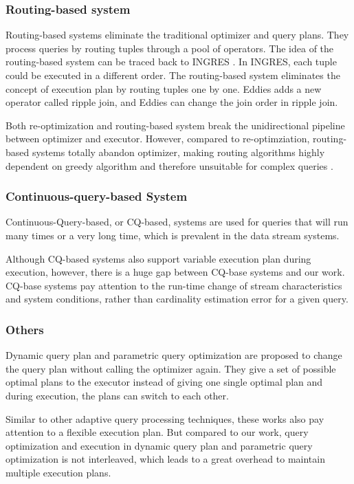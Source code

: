     \subsubsection{Routing-based system} Routing-based systems eliminate the traditional optimizer and query plans. They process queries by routing tuples through a pool of operators. The idea of the routing-based system can be traced back to INGRES \cite{paper46}. In INGRES, each tuple could be executed in a different order. The routing-based system eliminates the concept of execution plan by routing tuples one by one. Eddies \cite{paper30} adds a new operator called ripple join, and Eddies can change the join order in ripple join.\par
    Both re-optimization and routing-based system break the unidirectional pipeline between optimizer and executor. However, compared to re-optimziation, routing-based systems totally abandon optimizer, making routing algorithms highly dependent on greedy algorithm and therefore unsuitable for complex queries \cite{paper47}.
    
    \subsubsection{Continuous-query-based System} Continuous-Query-based, or CQ-based, systems are used for queries that will run many times or a very long time, which is prevalent in the data stream systems.\par
    Although CQ-based systems also support variable execution plan during execution, however, there is a huge gap between CQ-base systems and our work. CQ-base systems pay attention to the run-time change of stream characteristics and system conditions, rather than cardinality estimation error for a given query.
    
    \subsubsection{Others} Dynamic query plan \cite{paper25, paper42, paper43} and parametric query optimization \cite{paper44} are proposed to change the query plan without calling the optimizer again. They give a set of possible optimal plans to the executor instead of giving one single optimal plan and during execution, the plans can switch to each other.\par
    Similar to other adaptive query processing techniques, these works also pay attention to a flexible execution plan. But compared to our work, query optimization and execution in dynamic query plan and parametric query optimization is not interleaved, which leads to a great overhead to maintain multiple execution plans.

